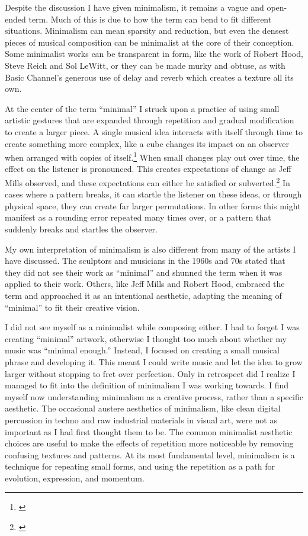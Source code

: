 \documentclass[12pt,twoside]{reedthesis}
\begin{document}
Despite the discussion I have given minimalism, it remains a vague and open-ended term. Much of this is due to how the term can bend to fit different situations. Minimalism can mean sparsity and reduction, but even the densest pieces of musical composition can be minimalist at the core of their conception. Some minimalist works can be transparent in form, like the work of Robert Hood, Steve Reich and Sol LeWitt, or they can be made murky and obtuse, as with Basic Channel's generous use of delay and reverb which creates a texture all its own.

At the center of the term ``minimal'' I struck upon a practice of using small artistic gestures that are expanded through repetition and gradual modification to create a larger piece. A single musical idea interacts with itself through time to create something more complex, like a cube changes its impact on an observer when arranged with copies of itself.\footnote{\cite{lewittSeries123471968}} When small changes play out over time, the effect on the listener is pronounced. This creates expectations of change as Jeff Mills observed, and these expectations can either be satisfied or subverted.\footnote{\cite{schmidtJeffMillsLecture1998a}} In cases where a pattern breaks, it can startle the listener on these ideas, or through physical space, they can create far larger permutations. In other forms this might manifest as a rounding error repeated many times over, or a pattern that suddenly breaks and startles the observer.

My own interpretation of minimalism is also different from many of the artists I have discussed. The sculptors and musicians in the 1960s and 70s stated that they did not see their work as ``minimal'' and shunned the term when it was applied to their work. Others, like Jeff Mills and Robert Hood, embraced the term and approached it as an intentional aesthetic, adapting the meaning of ``minimal'' to fit their creative vision.

I did not see myself as a minimalist while composing either. I had to forget I was creating ``minimal'' artwork, otherwise I thought too much about whether my music was ``minimal enough.'' Instead, I focused on creating a small musical phrase and developing it. This meant I could write music and let the idea to grow larger without stopping to fret over perfection. Only in retrospect did I realize I managed to fit into the definition of minimalism I was working towards. I find myself now understanding minimalism as a creative process, rather than a specific aesthetic. The occasional austere aesthetics of minimalism, like clean digital percussion in techno and raw industrial materials in visual art, were not as important as I had first thought them to be. The common minimalist aesthetic choices are useful to make the effects of repetition more noticeable by removing confusing textures and patterns. At its most fundamental level, minimalism is a technique for repeating small forms, and using the repetition as a path for evolution, expression, and momentum.
\end{document}
